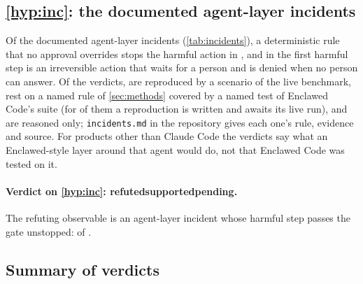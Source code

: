 \documentclass[11pt]{article}
\newcommand{\sys}{Enclawed}
\newcommand{\cz}{Enclawed Code}
\newcommand{\czVerdict}[1]{\textbf{\ifcase#1 refuted\or supported\or pending\fi}}
\newcommand{\VerdictHsix}{\czVerdict{\HsixCode}}
\begin{document}
\subsection{\ref{hyp:inc}: the documented agent-layer incidents}
\label{sec:res-h6}

Of the \IncLayerTotal{} documented agent-layer incidents
(\cref{tab:incidents}), a deterministic rule that no approval overrides
stops the harmful action in \IncLayerRule{}, and in \IncLayerApproval{}
the first harmful step is an irreversible action that waits for a person
and is denied when no person can answer. Of the \IncEvidenceAgentLayer{}
verdicts, \IncEvidenceReproduced{} are reproduced by a scenario of the
live benchmark, \IncEvidenceRuleTraced{} rest on a named rule of
\cref{sec:methods} covered by a named test of \cz{}'s suite (for
\IncEvidenceScenarioPending{} of them a reproduction is written and
awaits its live run), and \IncEvidenceReasoned{} are reasoned only;
\texttt{incidents.md} in the repository gives each one's rule, evidence
and source. For products other than Claude Code the verdicts say what an
\sys{}-style layer around that agent would do, not that \cz{} was tested
on it.

\paragraph{Verdict on \ref{hyp:inc}: \VerdictHsix{}.} The refuting
observable is an agent-layer incident whose harmful step passes the gate
unstopped: \IncLayerNotStopped{} of \IncLayerTotal{}.

\subsection{Summary of verdicts}
\label{sec:res-summary}
\end{document}

